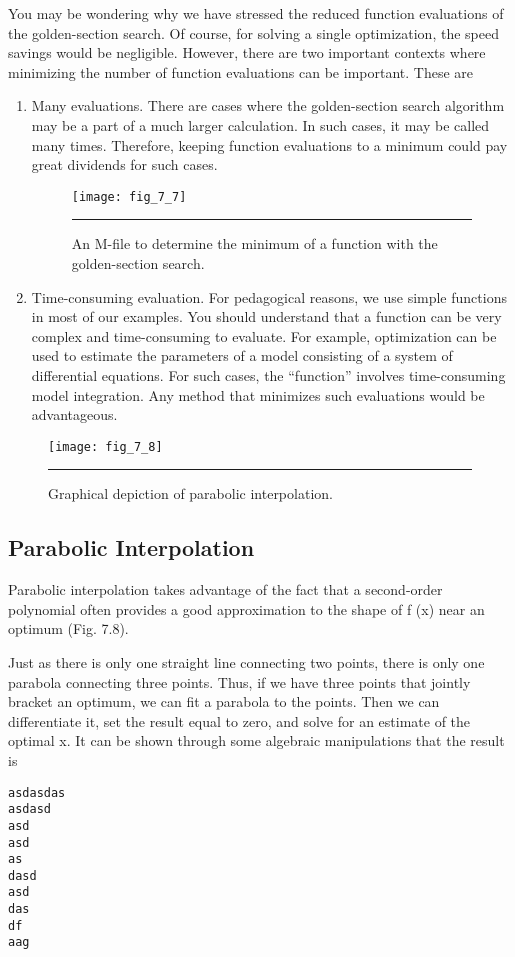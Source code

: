 \documentclass[../main.tex]{subfiles}
\begin{document}
You may be wondering why we have stressed the reduced function evaluations of the
golden-section search. Of course, for solving a single optimization, the speed savings
would be negligible. However, there are two important contexts where minimizing the
number of function evaluations can be important. These are
\begin{enumerate}
	\item Many evaluations. There are cases where the golden-section search algorithm may be a
	part of a much larger calculation. In such cases, it may be called many times. Therefore,
	keeping function evaluations to a minimum could pay great dividends for such cases.
	
	\begin{figure}[H]
		\centering
		\texttt{[image: fig\_7\_7]}
		\caption{\textsf{An M-file to determine the minimum of a function with the golden-section search.}}
		\color{cyan} \rule{\linewidth}{0,5mm}
		\label{fig:fig_7_7}
	\end{figure}

	\item Time-consuming evaluation. For pedagogical reasons, we use simple functions in
	most of our examples. You should understand that a function can be very complex
	and time-consuming to evaluate. For example, optimization can be used to estimate
	the parameters of a model consisting of a system of differential equations. For such
	cases, the ``function'' involves time-consuming model integration. Any method that
	minimizes such evaluations would be advantageous.
\end{enumerate}

\begin{figure}[H]
	\centering
	\texttt{[image: fig\_7\_8]}
	\caption{\textsf{Graphical depiction of parabolic interpolation.}}
	\color{cyan} \rule{\linewidth}{0,5mm}
	\label{fig:fig_7_8}
\end{figure}

\subsection{Parabolic Interpolation}

\noindent Parabolic interpolation takes advantage of the fact that a second-order polynomial often
provides a good approximation to the shape of f (x) near an optimum (Fig. 7.8).

Just as there is only one straight line connecting two points, there is only one parabola
connecting three points. Thus, if we have three points that jointly bracket an optimum, we
can fit a parabola to the points. Then we can differentiate it, set the result equal to zero, and
solve for an estimate of the optimal x. It can be shown through some algebraic manipulations
that the result is
\begin{lstlisting}[numbers=none,frame=none]
asdasdas
asdasd
asd
asd
as
dasd
asd
das
df
aag
\end{lstlisting}
\end{document}
